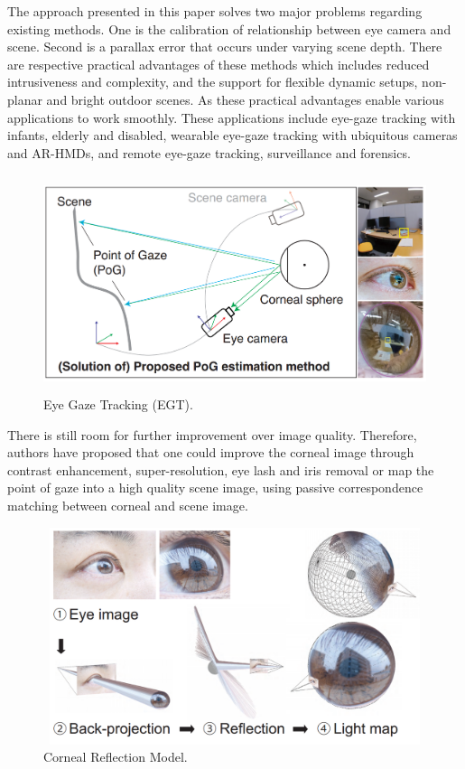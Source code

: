 The approach presented in this paper solves two major problems regarding existing methods. One is the calibration of relationship between eye camera and scene. Second is a parallax error that occurs under varying scene depth. There are respective practical advantages of these methods which includes reduced intrusiveness and complexity, and the support for flexible dynamic setups, non-planar and bright outdoor scenes. As these practical advantages enable various applications to work smoothly. These applications include eye-gaze tracking with infants, elderly and disabled, wearable eye-gaze tracking with ubiquitous cameras and AR-HMDs, and remote eye-gaze tracking, surveillance and forensics.

\begin{figure}[!hbt]
  \centering
  \includegraphics[width=4.5in,height=2.5in]{chrisitanN.png}
  \caption{Eye Gaze Tracking (EGT).}
  \label{christian}
\end{figure}

There is still room for further improvement over image quality. Therefore, authors have proposed that one could improve the corneal image through contrast enhancement, super-resolution, eye lash and iris removal or map the point of gaze into a high quality scene image, using passive correspondence matching between corneal and scene image.


\begin{figure}[!hbt]
  \centering
  \includegraphics[width=4.5in,height=2.5in]{chrisitanN2.png}
  \caption{Corneal Reflection Model.}
  \label{christian}
\end{figure}


